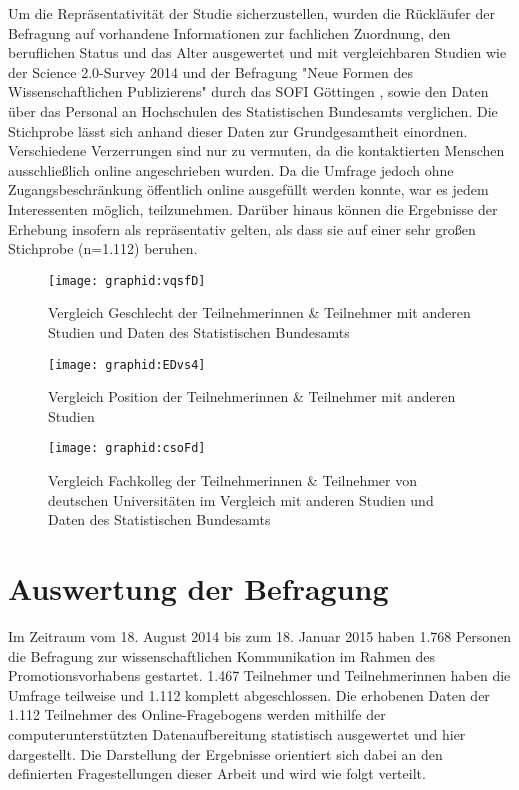 Um die Repräsentativität der Studie sicherzustellen, wurden die Rückläufer der Befragung auf vorhandene Informationen zur fachlichen Zuordnung, den beruflichen Status und das Alter ausgewertet und mit vergleichbaren Studien wie der Science 2.0-Survey 2014 \cite{Pscheida_2015} und der Befragung "Neue Formen des Wissenschaftlichen Publizierens" durch das SOFI Göttingen \cite{Hanekop_2008}, sowie den Daten über das Personal an Hochschulen des Statistischen Bundesamts \cite{Destatis_2014} verglichen. Die Stichprobe lässt sich anhand dieser Daten zur Grundgesamtheit einordnen. Verschiedene Verzerrungen sind nur zu vermuten, da die kontaktierten Menschen ausschließlich online angeschrieben wurden. Da die Umfrage jedoch ohne Zugangsbeschränkung öffentlich online ausgefüllt werden konnte, war es jedem Interessenten möglich, teilzunehmen. Darüber hinaus können die Ergebnisse der Erhebung insofern als repräsentativ gelten, als dass sie auf einer sehr großen Stichprobe (n=1.112) beruhen.

\begin{figure}[h!]
\texttt{[image: graphid:vqsfD]}
\caption{Vergleich Geschlecht der Teilnehmerinnen & Teilnehmer mit anderen Studien und Daten des Statistischen Bundesamts}
\end{figure}

\begin{figure}[h!]
\texttt{[image: graphid:EDvs4]}
\caption{Vergleich Position der Teilnehmerinnen & Teilnehmer mit anderen Studien}
\end{figure}

\begin{figure}[h!]
\texttt{[image: graphid:csoFd]}
\caption{Vergleich Fachkolleg der Teilnehmerinnen & Teilnehmer von deutschen Universitäten im Vergleich mit anderen Studien und Daten des Statistischen Bundesamts}
\end{figure}

\section{Auswertung der Befragung}

Im Zeitraum vom 18. August 2014 bis zum 18. Januar 2015 haben 1.768 Personen die Befragung zur wissenschaftlichen Kommunikation im Rahmen des Promotionsvorhabens gestartet. 1.467 Teilnehmer und Teilnehmerinnen haben die Umfrage teilweise und 1.112 komplett abgeschlossen. Die erhobenen Daten der 1.112 Teilnehmer des Online-Fragebogens werden mithilfe der computerunterstützten Datenaufbereitung statistisch ausgewertet und hier dargestellt. Die Darstellung der Ergebnisse orientiert sich dabei an den definierten Fragestellungen dieser Arbeit und wird wie folgt verteilt.

